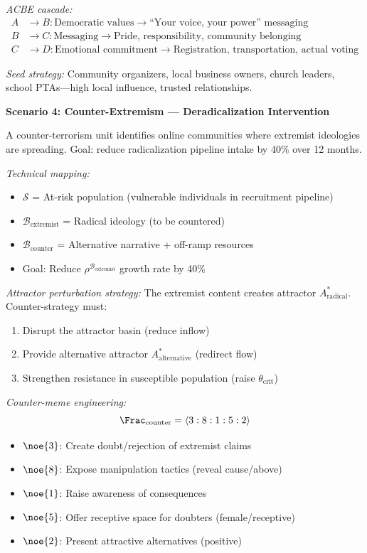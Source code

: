 \begin{tcolorbox}[colback=yellow!5!white,colframe=yellow!65!black,title=\textbf{Real-Life Scenarios: Social Engineering Applications},breakable]
\textit{ACBE cascade:}
\begin{align*}
    A &\to B: \text{Democratic values} \to \text{``Your voice, your power'' messaging} \\
    B &\to C: \text{Messaging} \to \text{Pride, responsibility, community belonging} \\
    C &\to D: \text{Emotional commitment} \to \text{Registration, transportation, actual voting}
\end{align*}

\textit{Seed strategy:} Community organizers, local business owners, church leaders, school PTAs---high local influence, trusted relationships.

\medskip

\textbf{Scenario 4: Counter-Extremism --- Deradicalization Intervention}

A counter-terrorism unit identifies online communities where extremist ideologies are spreading. Goal: reduce radicalization pipeline intake by 40\% over 12 months.

\textit{Technical mapping:}
\begin{itemize}
    \item $\mathcal{S}$ = At-risk population (vulnerable individuals in recruitment pipeline)
    \item $\mathcal{B}_{\mathrm{extremist}}$ = Radical ideology (to be countered)
    \item $\mathcal{B}_{\mathrm{counter}}$ = Alternative narrative + off-ramp resources
    \item Goal: Reduce $\rho^{\mathcal{B}_{\mathrm{extremist}}}$ growth rate by 40\%
\end{itemize}

\textit{Attractor perturbation strategy:}
The extremist content creates attractor $A_{\mathrm{radical}}^*$. Counter-strategy must:
\begin{enumerate}
    \item Disrupt the attractor basin (reduce inflow)
    \item Provide alternative attractor $A_{\mathrm{alternative}}^*$ (redirect flow)
    \item Strengthen resistance in susceptible population (raise $\theta_{\mathrm{crit}}$)
\end{enumerate}

\textit{Counter-meme engineering:}
\[
    \Frac_{\mathrm{counter}} = \langle 3:8:1:5:2 \rangle
\]
\begin{itemize}
    \item $\noe{3}$: Create doubt/rejection of extremist claims
    \item $\noe{8}$: Expose manipulation tactics (reveal cause/above)
    \item $\noe{1}$: Raise awareness of consequences
    \item $\noe{5}$: Offer receptive space for doubters (female/receptive)
    \item $\noe{2}$: Present attractive alternatives (positive)
\end{itemize}


\end{tcolorbox}
